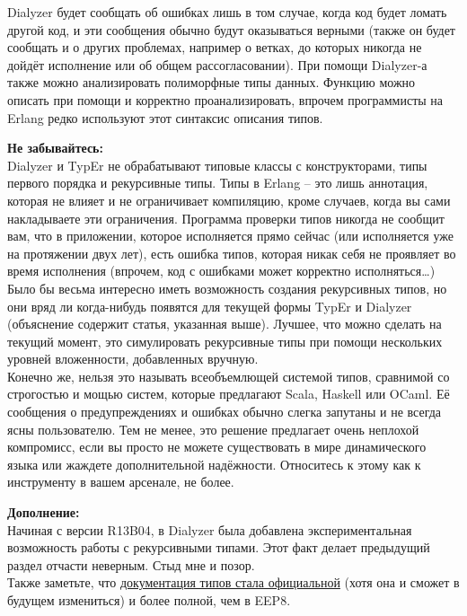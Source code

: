 Dialyzer будет сообщать об ошибках лишь в том случае, когда код будет ломать другой код, и эти сообщения обычно будут оказываться верными (также он будет сообщать и о других проблемах, например о ветках, до которых никогда не дойдёт исполнение или об общем рассогласовании).
При помощи Dialyzer\--а также можно анализировать полиморфные типы данных.
Функцию  можно описать при помощи  и корректно проанализировать, впрочем программисты на Erlang редко используют этот синтаксис описания типов.\\
\colorbox{lorange}
{
    \begin{minipage}{\linewidth}
        \textbf{Не забывайтесь:}\\
Dialyzer и TypEr не обрабатывают типовые классы с конструкторами, типы первого порядка и рекурсивные типы.
Типы в Erlang \--- это лишь аннотация, которая не влияет и не ограничивает компиляцию, кроме случаев, когда вы сами накладываете эти ограничения.
Программа проверки типов никогда не сообщит вам, что в приложении, которое исполняется прямо сейчас (или исполняется уже на протяжении двух лет), есть ошибка типов, которая никак себя не проявляет во время исполнения (впрочем, код с ошибками может корректно исполняться\ldots)\\
Было бы весьма интересно иметь возможность создания рекурсивных типов, но они вряд ли когда\--нибудь появятся для текущей формы TypEr и Dialyzer (объяснение содержит статья, указанная выше).
Лучшее, что можно сделать на текущий момент, это симулировать рекурсивные типы при помощи нескольких уровней вложенности, добавленных вручную.\\
Конечно же, нельзя это называть всеобъемлющей системой типов, сравнимой со строгостью и мощью систем, которые предлагают Scala, Haskell или OCaml.
Её сообщения о предупреждениях и ошибках обычно слегка запутаны и не всегда ясны пользователю.
Тем не менее, это решение предлагает очень неплохой компромисс, если вы просто не можете существовать в мире динамического языка или жаждете дополнительной надёжности.
Относитесь к этому как к инструменту в вашем арсенале, не более.
    \end{minipage}
}
\colorbox{lgray}
{
    \begin{minipage}{\linewidth}
\textbf{Дополнение:}\\
Начиная с версии R13B04, в Dialyzer была добавлена экспериментальная возможность работы с рекурсивными типами.
Этот факт делает предыдущий раздел отчасти неверным.
Стыд мне и позор.\\
Также заметьте, что \href{http://erlang.org/doc/reference\_manual/typespec.html}{документация типов стала официальной} (хотя она и сможет в будущем измениться) и более полной, чем в EEP8.
    \end{minipage}
}
